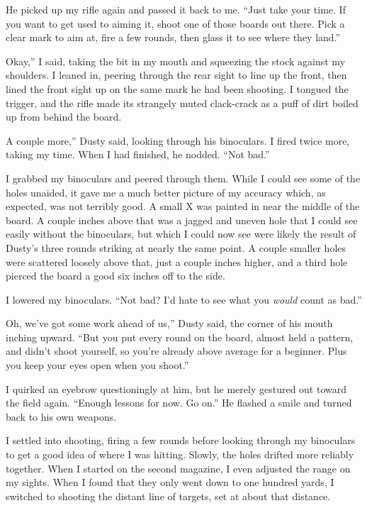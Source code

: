 He picked up my rifle again and passed it back to me. “Just take your time. If you want to get used to aiming it, shoot one of those boards out there. Pick a clear mark to aim at, fire a few rounds, then glass it to see where they land.”

\leavevmode{}Okay,” I said, taking the bit in my mouth and squeezing the stock against my shoulders. I leaned in, peering through the rear sight to line up the front, then lined the front sight up on the same mark he had been shooting. I tongued the trigger, and the rifle made its strangely muted clack-crack as a puff of dirt boiled up from behind the board.

\leavevmode{}A couple more,” Dusty said, looking through his binoculars. I fired twice more, taking my time. When I had finished, he nodded. “Not bad.”

I grabbed my binoculars and peered through them. While I could see some of the holes unaided, it gave me a much better picture of my accuracy which, as expected, was not terribly good. A small X was painted in near the middle of the board. A couple inches above that was a jagged and uneven hole that I could see easily without the binoculars, but which I could now see were likely the result of Dusty’s three rounds striking at nearly the same point. A couple smaller holes were scattered loosely above that, just a couple inches higher, and a third hole pierced the board a good six inches off to the side.

I lowered my binoculars. “Not bad? I’d hate to see what you \textit{would} count as bad.”

\leavevmode{}Oh, we’ve got some work ahead of us,” Dusty said, the corner of his mouth inching upward. “But you put every round on the board, almost held a pattern, and didn’t shoot yourself, so you’re already above average for a beginner. Plus you keep your eyes open when you shoot.”

I quirked an eyebrow questioningly at him, but he merely gestured out toward the field again. “Enough lessons for now. Go on.” He flashed a smile and turned back to his own weapons.

I settled into shooting, firing a few rounds before looking through my binoculars to get a good idea of where I was hitting. Slowly, the holes drifted more reliably together. When I started on the second magazine, I even adjusted the range on my sights. When I found that they only went down to one hundred yards, I switched to shooting the distant line of targets, set at about that distance.

